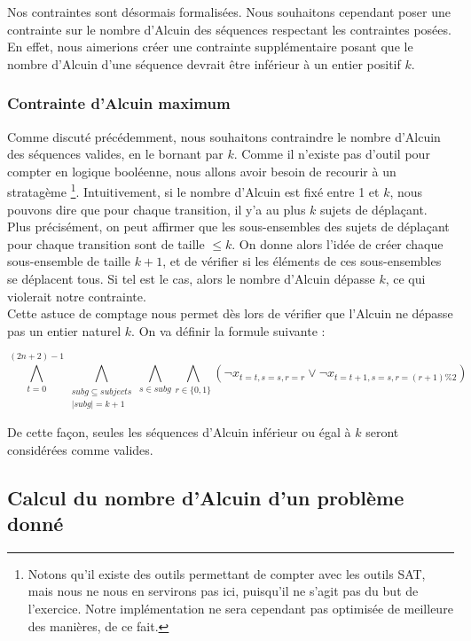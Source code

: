 \documentclass{article}
\begin{document}
\vspace{3em}

\noindent Nos contraintes sont désormais formalisées. Nous souhaitons cependant poser une contrainte sur le nombre d'Alcuin des séquences respectant les contraintes posées. En effet, nous aimerions créer une contrainte supplémentaire posant que le nombre d'Alcuin d'une séquence devrait être inférieur à un entier positif $k$.

\subsubsection{Contrainte d'Alcuin maximum}

\noindent Comme discuté précédemment, nous souhaitons contraindre le nombre d'Alcuin des séquences valides, en le bornant par $k$. Comme il n'existe pas d'outil pour compter en logique booléenne, nous allons avoir besoin de recourir à un stratagème \footnote{Notons qu'il existe des outils permettant de compter avec les outils SAT, mais nous ne nous en servirons pas ici, puisqu'il ne s'agit pas du but de l'exercice. Notre implémentation ne sera cependant pas optimisée de meilleure des manières, de ce fait.}. Intuitivement, si le nombre d'Alcuin est fixé entre 1 et $k$, nous pouvons dire que pour chaque transition, il y'a au plus $k$ sujets de déplaçant. \\

\noindent Plus précisément, on peut affirmer que les sous-ensembles des sujets de déplaçant pour chaque transition sont de taille $\leq k$. On donne alors l'idée de créer chaque sous-ensemble de taille $k+1$, et de vérifier si les éléments de ces sous-ensembles se déplacent tous. Si tel est le cas, alors le nombre d'Alcuin dépasse $k$, ce qui violerait notre contrainte. \\

\noindent Cette astuce de comptage nous permet dès lors de vérifier que l'Alcuin ne dépasse pas un entier naturel $k$. On va définir la formule suivante :

\[
\bigwedge_{t=0}^{(2n+2) - 1}
\bigwedge_{\substack{subg \subseteq subjects \\ \lvert subg \rvert = k+1}}
\bigwedge_{s \in subg}
\bigwedge_{r \in \{0, 1\}}
\left(
\lnot x_{t=t, s=s, r=r} \lor
\lnot x_{t=t+1, s=s, r=(r+1) \% 2}
\right)
\]

\noindent De cette façon, seules les séquences d'Alcuin inférieur ou égal à $k$ seront considérées comme valides.

\subsection{Calcul du nombre d'Alcuin d'un problème donné}
\end{document}
